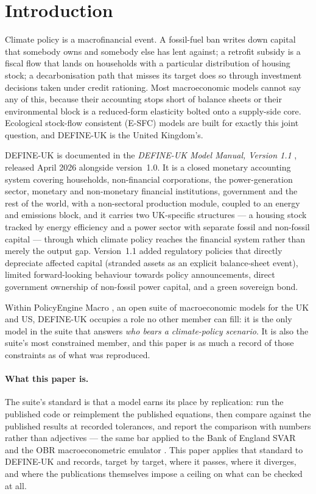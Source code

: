\section{Introduction}
\label{sec:intro}

Climate policy is a macrofinancial event. A fossil-fuel ban writes down capital that somebody owns and somebody else has lent against; a retrofit subsidy is a fiscal flow that lands on households with a particular distribution of housing stock; a decarbonisation path that misses its target does so through investment decisions taken under credit rationing. Most macroeconomic models cannot say any of this, because their accounting stops short of balance sheets or their environmental block is a reduced-form elasticity bolted onto a supply-side core. Ecological stock-flow consistent (E-SFC) models are built for exactly this joint question, and DEFINE-UK is the United Kingdom's.

DEFINE-UK is documented in the \emph{DEFINE-UK Model Manual, Version 1.1} \citep{georgedafermos2026manual}, released April 2026 alongside version~1.0. It is a closed monetary accounting system covering households, non-financial corporations, the power-generation sector, monetary and non-monetary financial institutions, government and the rest of the world, with a non-sectoral production module, coupled to an energy and emissions block, and it carries two UK-specific structures --- a housing stock tracked by energy efficiency and a power sector with separate fossil and non-fossil capital --- through which climate policy reaches the financial system rather than merely the output gap. Version~1.1 added regulatory policies that directly depreciate affected capital (stranded assets as an explicit balance-sheet event), limited forward-looking behaviour towards policy announcements, direct government ownership of non-fossil power capital, and a green sovereign bond.

Within PolicyEngine Macro \citep{policyengine}, an open suite of macroeconomic models for the UK and US, DEFINE-UK occupies a role no other member can fill: it is the only model in the suite that answers \emph{who bears a climate-policy scenario}. It is also the suite's most constrained member, and this paper is as much a record of those constraints as of what was reproduced.

\paragraph{What this paper is.} The suite's standard is that a model earns its place by replication: run the published code or reimplement the published equations, then compare against the published results at recorded tolerances, and report the comparison with numbers rather than adjectives --- the same bar applied to the Bank of England SVAR \citep{ahmadi2026boesvar} and the OBR macroeconometric emulator \citep{ahmadi2026obr}. This paper applies that standard to DEFINE-UK and records, target by target, where it passes, where it diverges, and where the publications themselves impose a ceiling on what can be checked at all.

